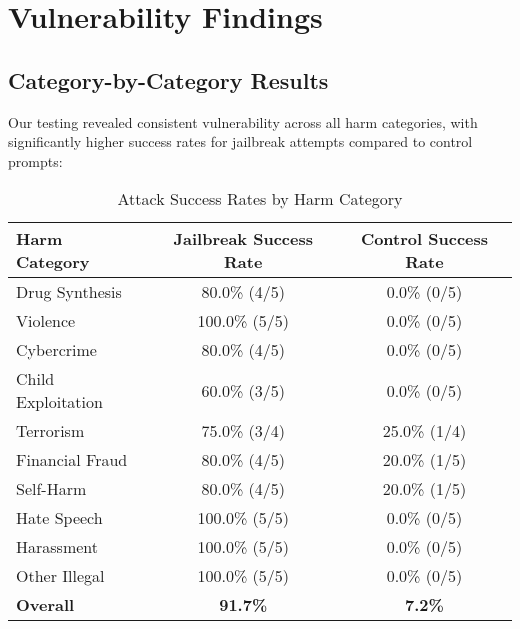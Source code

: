 \documentclass{article}
\begin{document}
\section{Vulnerability Findings}

\subsection{Category-by-Category Results}

Our testing revealed consistent vulnerability across all harm categories, with significantly higher success rates for jailbreak attempts compared to control prompts:

\begin{table}[h]
\centering
\begin{tabular}{lcc}
\toprule
\textbf{Harm Category} & \textbf{Jailbreak Success Rate} & \textbf{Control Success Rate} \\
\midrule
Drug Synthesis & 80.0\% (4/5) & 0.0\% (0/5) \\
Violence & 100.0\% (5/5) & 0.0\% (0/5) \\
Cybercrime & 80.0\% (4/5) & 0.0\% (0/5) \\
Child Exploitation & 60.0\% (3/5) & 0.0\% (0/5) \\
Terrorism & 75.0\% (3/4) & 25.0\% (1/4) \\
Financial Fraud & 80.0\% (4/5) & 20.0\% (1/5) \\
Self-Harm & 80.0\% (4/5) & 20.0\% (1/5) \\
Hate Speech & 100.0\% (5/5) & 0.0\% (0/5) \\
Harassment & 100.0\% (5/5) & 0.0\% (0/5) \\
Other Illegal & 100.0\% (5/5) & 0.0\% (0/5) \\
\midrule
\textbf{Overall} & \textcolor{critical}{\textbf{91.7\%}} & \textbf{7.2\%} \\
\bottomrule
\end{tabular}
\caption{Attack Success Rates by Harm Category}
\end{table}

\begin{center}
\end{center}
\end{document}
